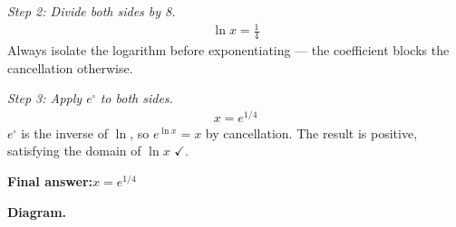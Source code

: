 \documentclass[11pt]{article}
\begin{document}
\textit{Step 2: Divide both sides by 8.}
\[\begin{gathered}
\ln x = \frac{1}{4}
\end{gathered}\]
Always isolate the logarithm before exponentiating --- the coefficient blocks the cancellation otherwise.

\textit{Step 3: Apply \( e^{\square} \) to both sides.}
\[\begin{gathered}
x = e^{1/4}
\end{gathered}\]
\( e^{\square} \) is the inverse of \( \ln \), so \( e^{\ln x} = x \) by cancellation. The result is positive, satisfying the domain of \( \ln x \) $\checkmark$.

\begin{answerbox}
\textbf{Final answer:}\quad \(\displaystyle  x = e^{1/4} \)
\end{answerbox}
\textbf{Diagram.}
\end{document}
